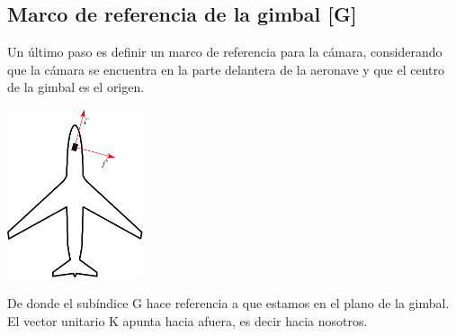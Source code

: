 \subsection{Marco de referencia de la gimbal [G]}
Un último paso es definir un marco de referencia para la cámara, considerando que la cámara se encuentra en la parte delantera de
la aeronave y que el centro de la gimbal es el origen.
\begin{center}
	\includegraphics[width=0.3\textwidth]{Contenido/Cuerpo/Capitulo3/Fig7.eps}
	\label{fig:ModeloMat:Fig1}
\end{center}
De donde el subíndice G hace referencia a que estamos en el plano de la gimbal. El vector unitario K apunta hacia afuera,
es decir hacia nosotros.
